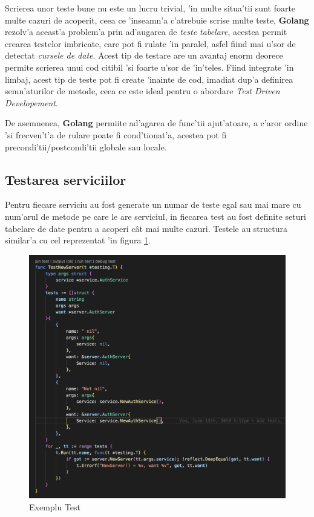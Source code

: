 \documentclass[12pt,a4paper,twoside]{report}
\begin{document}
Scrierea unor teste bune nu este un lucru trivial, 'in multe situa'tii sunt foarte multe cazuri de acoperit, ceea ce 'inseamn'a c'atrebuie scrise multe teste, \textbf{Golang} rezolv'a aceast'a problem'a prin ad'augarea de \textit{teste tabelare}, acestea permit crearea testelor imbricate, care pot fi rulate 'in paralel, asfel fiind mai u'sor de detectat \textit{cursele de date}. Acest tip de testare are un avantaj enorm deorece permite scrierea unui cod citibil 'si foarte u'sor de 'in'teles. Fiind integrate 'in limbaj, acest tip de teste pot fi create 'inainte de cod, imadiat dup'a definirea semn'aturilor de metode, ceea ce este ideal pentru o abordare \textit{Test Driven Developement}.

De asemnenea, \textbf{Golang} permiite ad'agarea de func'tii ajut'atoare, a c'aror ordine 'si frecven't'a de rulare poate fi cond'tionat'a, acestea pot fi precondi'tii/postcondi'tii globale sau locale.

\subsection{Testarea serviciilor}

Pentru fiecare serviciu au fost generate un numar de teste egal sau mai mare cu num'arul de metode pe care le are serviciul, in fiecarea test au fost definite seturi tabelare de date pentru a acoperi cât mai multe cazuri. Testele au structura similar'a cu cel reprezentat 'in figura \ref{test_example}.

\begin{figure}[H]
\begin{center}
\advance\leftskip-3cm
\advance\rightskip-3cm
\includegraphics[keepaspectratio=true,scale=0.28]{img/tabel_test.png}
\caption{Exemplu Test}
\label{test_example}
\end{center}
\end{figure}
\end{document}
